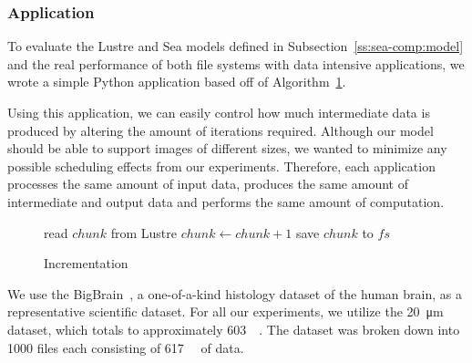 \documentclass[10pt,journal,compsoc]{IEEEtran}
\makeatletter
\newcommand{\removelatexerror}{\let\@latex@error\@gobble}
\makeatother
\begin{document}
\subsubsection{Application}


      To evaluate the Lustre and Sea models defined in
      Subsection~\ref{ss:sea-comp:model} and the real performance of both file
      systems with data intensive applications, we wrote a simple Python
      application based off of Algorithm~\ref{alg:sea-comp:incrementation}.
      
      Using this application, we can easily control how much intermediate data
      is produced by altering the amount of iterations required. Although our
      model should be able to support images of different sizes, we wanted to
      minimize any possible scheduling effects from our experiments. Therefore,
      each application processes the same amount of input data, produces the
      same amount of intermediate and output data and performs the same amount
      of computation.
                                                                                   

      \begin{figure}[!t]
        \removelatexerror
        \begin{algorithm}[H]
          \caption{Incrementation}\label{alg:sea-comp:incrementation}
          \SetAlgoLined {}   { read $chunk$ from Lustre  { $chunk\gets chunk+1$ save $chunk$ to $fs$ } }
        \end{algorithm}
      \end{figure}

      We use the BigBrain~\cite{amunts2013bigbrain}, a one-of-a-kind histology
      dataset of the human brain, as a representative scientific dataset. For
      all our experiments, we utilize the \SI{20}{\micro\meter} dataset, which
      totals to approximately \SI{603}{\gibi\byte}. The dataset was broken down
      into 1000 files each consisting of \SI{617}{\mebi\byte} of data.
      
\end{document}

